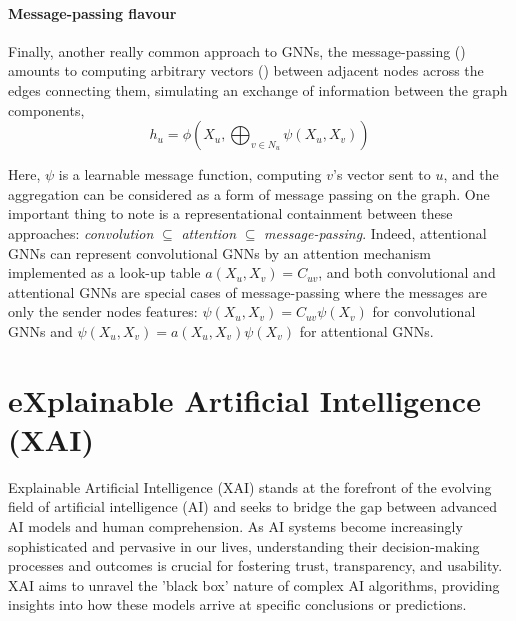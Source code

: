 \documentclass[binding=0.6cm]{sapthesis}
\begin{document}
\paragraph{Message-passing flavour}
\label{sec:bg.gnn.mp-arch}
Finally, another really common approach to GNNs, the message-passing  (\cite{gilmer2017-message-passing,battaglia2018-relational}) amounts to computing arbitrary vectors () between adjacent nodes across the edges connecting them, simulating an exchange of information between the graph components,
\begin{equation}
    h_u = \phi \left( X_u, \bigoplus_{v \in N_u} \psi(X_u,X_v) \right)
\end{equation}

Here, $\psi$ is a learnable message function, computing $v$’s vector sent to $u$, and the aggregation can be considered as a form of message passing on the graph. One important thing to note is a representational containment between these approaches: \textit{convolution} $\subseteq$ \textit{attention} $\subseteq$ \textit{message-passing}.  Indeed, attentional
GNNs can represent convolutional GNNs by an attention mechanism implemented as a look-up table $a(X_u, X_v) = C_{uv}$, and both convolutional and attentional GNNs are special cases of message-passing where the messages are only the sender nodes features: $\psi(X_u, X_v) = C_{uv}\psi(X_v)$ for convolutional GNNs and $\psi(X_u, X_v) = a(X_u, X_v)\psi(X_v)$ for attentional GNNs.



\newpage
\section{eXplainable Artificial Intelligence (XAI)}
\label{sec:bg.xai}
Explainable Artificial Intelligence (XAI) stands at the forefront of the evolving field of artificial intelligence (AI) and seeks to bridge the gap between advanced AI models and human comprehension. As AI systems become increasingly sophisticated and pervasive in our lives, understanding their decision-making processes and outcomes is crucial for fostering trust, transparency, and usability. XAI aims to unravel the 'black box' nature of complex AI algorithms, providing insights into how these models arrive at specific conclusions or predictions.

\end{document}

